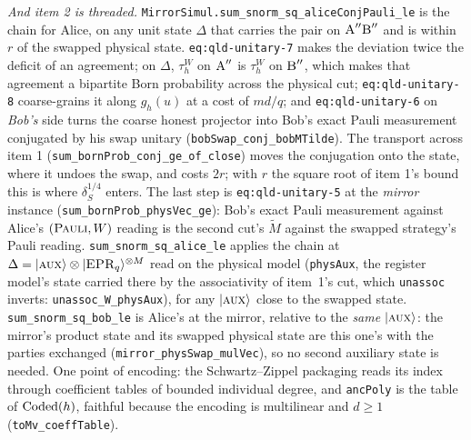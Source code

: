 \emph{And item 2 is threaded.} \texttt{MirrorSimul.sum\_snorm\_sq\_aliceConjPauli\_le} is
the chain for Alice, on any unit state $\Delta$ that carries the pair on $\textsc{A}'' \textsc{B}''$ and is
within $r$ of the swapped physical state. \texttt{eq:qld-unitary-7} makes the deviation twice the
deficit of an agreement; on $\Delta$, $\tau^W_h$ on $\textsc{A}''$ is $\tau^W_h$ on $\textsc{B}''$, which
makes that agreement a bipartite Born probability across the physical cut;
\texttt{eq:qld-unitary-8} coarse-grains it along $g_h(u)$ at a cost of $md/q$; and
\texttt{eq:qld-unitary-6} on \emph{Bob's} side turns the coarse honest projector into Bob's
exact Pauli measurement conjugated by his swap unitary (\texttt{bobSwap\_conj\_bobMTilde}).
The transport across item 1 (\texttt{sum\_bornProb\_conj\_ge\_of\_close}) moves the
conjugation onto the state, where it undoes the swap, and costs $2r$; with $r$ the square root of
item 1's bound this is where $\delta_S^{1/4}$ enters. The last step is
\texttt{eq:qld-unitary-5} at the \emph{mirror} instance (\texttt{sum\_bornProb\_physVec\_ge}):
Bob's exact Pauli measurement against Alice's $(\textsc{Pauli}, W)$ reading is the second cut's
$\tilde{M}$ against the swapped strategy's Pauli reading. \texttt{sum\_snorm\_sq\_alice\_le}
applies the chain at $\Delta = |\textsc{aux}\rangle \otimes |\textsc{EPR}_q\rangle^{\otimes M}$ read on the physical model
(\texttt{physAux}, the register model's state carried there by the associativity of item~1's cut,
which \texttt{unassoc} inverts: \texttt{unassoc\_W\_physAux}), for any $|\textsc{aux}\rangle$ close to the
swapped state. \texttt{sum\_snorm\_sq\_bob\_le} is Alice's at the
mirror, relative to the \emph{same} $|\textsc{aux}\rangle$: the mirror's product state and its swapped
physical state are this one's with the parties exchanged (\texttt{mirror\_physSwap\_mulVec}), so
no second auxiliary state is needed. One point of encoding: the Schwartz--Zippel packaging reads
its index through coefficient tables of bounded individual degree, and \texttt{ancPoly} is the
table of $\mathrm{Coded}(h)$, faithful because the encoding is multilinear and $d \geq 1$
(\texttt{toMv\_coeffTable}). 


